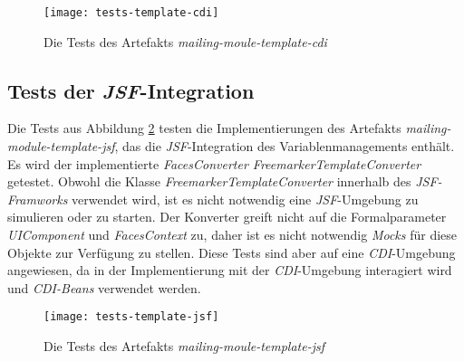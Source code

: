 \begin{figure}[h]
\centering
\texttt{[image: tests-template-cdi]}
\caption{Die Tests des Artefakts \emph{mailing-moule-template-cdi}}
\label{fig:tests-template-cdi}
\end{figure}

\subsection{Tests der \emph{JSF}-Integration}
Die Tests aus Abbildung \ref{fig:tests-template-jsf} testen die Implementierungen des Artefakts \emph{mailing-module-template-jsf}, das die \emph{JSF}-Integration des Variablenmanagements enthält. Es wird der implementierte \emph{FacesConverter FreemarkerTemplateConverter} getestet. Obwohl die Klasse \emph{FreemarkerTemplateConverter} innerhalb des \emph{JSF-Framworks} verwendet wird, ist es nicht notwendig eine \emph{JSF}-Umgebung zu simulieren oder zu starten. Der Konverter greift nicht auf die Formalparameter \emph{UIComponent} und \emph{FacesContext} zu, daher ist es nicht notwendig \emph{Mocks} für diese Objekte zur Verfügung zu stellen. Diese Tests sind aber auf eine \emph{CDI}-Umgebung angewiesen, da in der Implementierung mit der \emph{CDI}-Umgebung interagiert wird und \emph{CDI-Beans} verwendet werden.

\begin{figure}[h]
\centering
\texttt{[image: tests-template-jsf]}
\caption{Die Tests des Artefakts \emph{mailing-moule-template-jsf}}
\label{fig:tests-template-jsf}
\end{figure}

